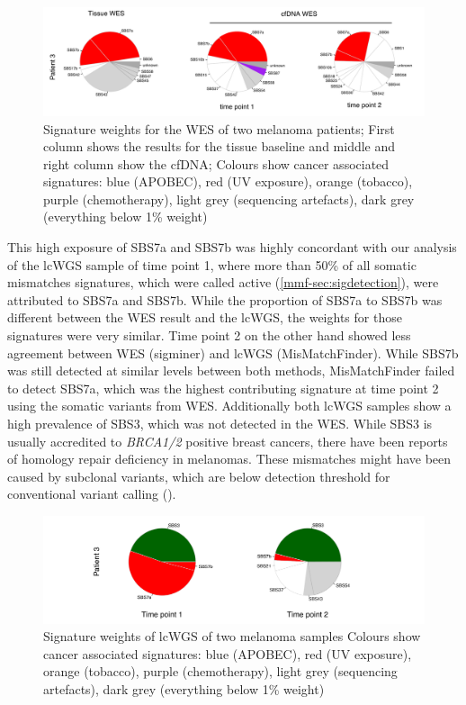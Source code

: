 \begin{figure}[ht]
\centering
\includegraphics[width=.99\linewidth]{Figures/MisMatchFinder/melanomaWESsignatures.pdf}
\caption[Signature weights for the WES of two melanoma patients]{Signature weights for the WES of two melanoma patients; First column shows the results for the tissue baseline and middle and right column show the cfDNA; Colours show cancer associated signatures: blue (APOBEC), red (UV exposure), orange (tobacco), purple (chemotherapy), light grey (sequencing artefacts), dark grey (everything below 1\% weight)}\label{fig:mmf-melaWESsigPie}
\end{figure}
 
This high exposure of SBS7a and SBS7b was highly concordant with our analysis of the lcWGS sample of time point 1, where more than 50\% of all somatic mismatches signatures, which were called active (\autoref{mmf-sec:sigdetection}), were attributed to SBS7a and SBS7b. While the proportion of SBS7a to SBS7b was different between the WES result and the lcWGS, the weights for those signatures were very similar. Time point 2 on the other hand showed less agreement between WES (sigminer) and lcWGS (MisMatchFinder). While SBS7b was still detected at similar levels between both methods, MisMatchFinder failed to detect SBS7a, which was the highest contributing signature at time point 2 using the somatic variants from WES. Additionally both lcWGS samples show a high prevalence of SBS3, which was not detected in the WES. While SBS3 is usually accredited to \textit{BRCA1/2} positive breast cancers, there have been reports of homology repair deficiency in melanomas. These mismatches might have been caused by subclonal variants, which are below detection threshold for conventional variant calling ().

\begin{figure}[ht]
\centering
\includegraphics[width=.99\linewidth]{Figures/MisMatchFinder/melanomaMMFsignatures.pdf}
\caption[Signature weights of lcWGS of two melanoma samples]{Signature weights of lcWGS of two melanoma samples Colours show cancer associated signatures: blue (APOBEC), red (UV exposure), orange (tobacco), purple (chemotherapy), light grey (sequencing artefacts), dark grey (everything below 1\% weight)}\label{fig:mmf-melaMMFsigPie}
\end{figure}


